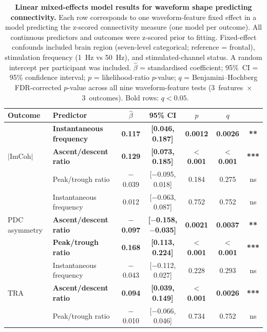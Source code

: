 \begin{table}[h!]
\caption{\textbf{Linear mixed-effects model results for waveform shape predicting
connectivity.}
Each row corresponds to one waveform-feature fixed effect in a model predicting the
z-scored connectivity measure (one model per outcome). All continuous predictors and
outcomes were z-scored prior to fitting. Fixed-effect confounds included brain region
(seven-level categorical; reference = frontal), stimulation frequency (1~Hz vs 50~Hz),
and stimulated-channel status. A random intercept per participant was included.
$\hat{\beta}$ = standardised coefficient; 95\%~CI = 95\% confidence interval;
$p$ = likelihood-ratio $p$-value; $q$ = Benjamini--Hochberg FDR-corrected $p$-value
across all nine waveform-feature tests (3~features~$\times$~3~outcomes).
Bold rows: $q < 0.05$.
}
\label{tab:lme}
\centering
\small
\begin{tabular}{llccccc}
\toprule
\textbf{Outcome} & \textbf{Predictor} & $\hat{\beta}$ & \textbf{95\% CI} & $p$ & $q$ & \\
\midrule
\multirow{3}{*}{$|$ImCoh$|$}
 & \textbf{Instantaneous frequency} & \textbf{0.117} & \textbf{[0.046, 0.187]} & \textbf{0.0012} & \textbf{0.0026} & \textbf{**} \\
 & \textbf{Ascent/descent ratio}    & \textbf{0.129} & \textbf{[0.073, 0.185]} & \textbf{$<$0.001} & \textbf{$<$0.001} & \textbf{***} \\
 & Peak/trough ratio                & $-$0.039      & [$-$0.095, 0.018]      & 0.184  & 0.275 & ns \\
\midrule
\multirow{3}{*}{PDC asymmetry}
 & Instantaneous frequency          & 0.012         & [$-$0.063, 0.087]      & 0.752  & 0.752 & ns \\
 & \textbf{Ascent/descent ratio}    & \textbf{$-$0.097} & \textbf{[$-$0.158, $-$0.035]} & \textbf{0.0021} & \textbf{0.0037} & \textbf{**} \\
 & \textbf{Peak/trough ratio}       & \textbf{0.168} & \textbf{[0.113, 0.224]} & \textbf{$<$0.001} & \textbf{$<$0.001} & \textbf{***} \\
\midrule
\multirow{3}{*}{TRA}
 & Instantaneous frequency          & $-$0.043      & [$-$0.112, 0.027]      & 0.228  & 0.293 & ns \\
 & \textbf{Ascent/descent ratio}    & \textbf{0.094} & \textbf{[0.039, 0.149]} & \textbf{$<$0.001} & \textbf{0.0026} & \textbf{***} \\
 & Peak/trough ratio                & $-$0.010      & [$-$0.066, 0.046]      & 0.734  & 0.752 & ns \\
\bottomrule
\end{tabular}
\end{table}
